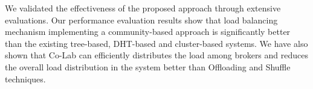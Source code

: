 We validated the effectiveness of the proposed approach through extensive evaluations. Our performance evaluation results show that load balancing mechanism implementing a community-based approach is significantly better than the existing tree-based, DHT-based and cluster-based systems. We have also shown that Co-Lab can efficiently distributes the load among brokers and reduces the overall load distribution in the system better than Offloading and Shuffle techniques.
